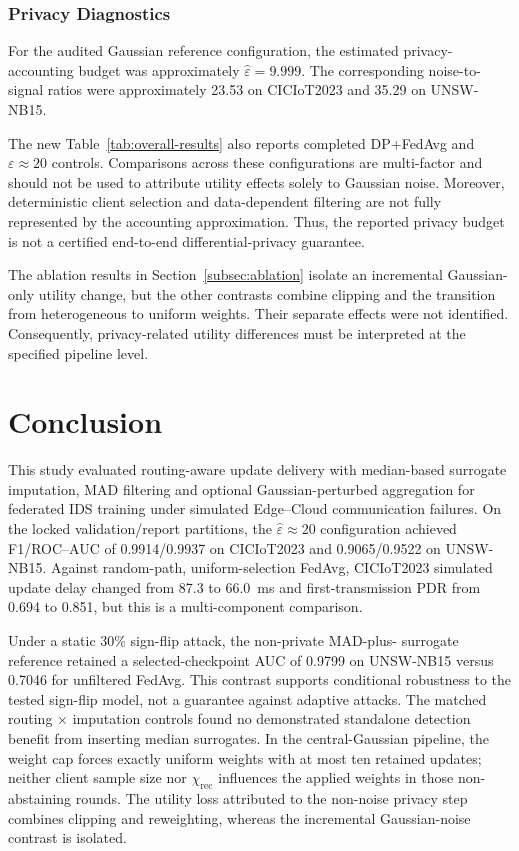 \documentclass[5p,times,numafflabel]{elsarticle}
\begin{document}
\subsubsection{Privacy Diagnostics}
\label{subsubsec:privacy-cost}

For the audited Gaussian reference configuration, the
estimated privacy-accounting budget was approximately
$\widehat{\varepsilon}=9.999$. The corresponding
noise-to-signal ratios were approximately 23.53 on
CICIoT2023 and 35.29 on UNSW-NB15.


The new Table~\ref{tab:overall-results} also reports completed
DP+FedAvg and $\varepsilon\approx20$ controls. Comparisons across
these configurations are multi-factor and should not be used to
attribute utility effects solely to Gaussian noise. Moreover,
deterministic client selection and data-dependent
filtering are not fully represented by the accounting
approximation. Thus, the reported privacy budget is
not a certified end-to-end differential-privacy
guarantee.

The ablation results in Section~\ref{subsec:ablation} isolate
an incremental Gaussian-only utility change, but the other
contrasts combine clipping and the transition from heterogeneous
to uniform weights. Their separate effects were not identified.
Consequently, privacy-related utility differences must be
interpreted at the specified pipeline level.


\section{Conclusion}
\label{sec:conclusion}

This study evaluated routing-aware update delivery with
median-based surrogate imputation, MAD filtering and optional
Gaussian-perturbed aggregation for federated IDS training under
simulated Edge--Cloud communication failures. On the locked
validation/report partitions, the $\widehat\varepsilon\approx20$
configuration achieved F1/ROC--AUC of 0.9914/0.9937 on CICIoT2023
and 0.9065/0.9522 on UNSW-NB15. Against random-path,
uniform-selection FedAvg, CICIoT2023 simulated update delay
changed from 87.3 to 66.0~ms and first-transmission PDR from
0.694 to 0.851, but this is a multi-component comparison.

Under a static 30\% sign-flip attack, the non-private MAD-plus-
surrogate reference retained a selected-checkpoint AUC of 0.9799
on UNSW-NB15 versus 0.7046 for unfiltered FedAvg. This contrast
supports conditional robustness to the tested sign-flip model,
not a guarantee against adaptive attacks. The matched routing
$\times$ imputation controls found no demonstrated standalone
detection benefit from inserting median surrogates. In the
central-Gaussian pipeline, the weight cap forces exactly uniform
weights with at most ten retained updates; neither client sample
size nor $\chi_{\mathrm{rec}}$ influences the applied weights in
those non-abstaining rounds. The utility loss attributed to the
non-noise privacy step combines clipping and reweighting,
whereas the incremental Gaussian-noise contrast is isolated.
\end{document}
